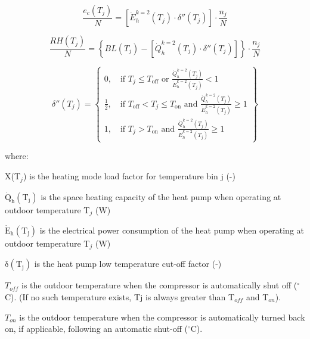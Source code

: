 \begin{equation}
  \frac{e_c(T_j)}{N} = \left[ \dot{E}_h^{k = 2}(T_j) \cdot \delta''(T_j) \right] \cdot \frac{n_j}{N}
\end{equation}

\begin{equation}
  \frac{RH(T_j)}{N} = \left\{ BL(T_j) - \left[\dot{Q}_h^{k = 2}(T_j) \cdot \delta''(T_j) \right] \right\} \cdot \frac{n_j}{N}
\end{equation}

\begin{equation}
\delta''(T_j) = \left\{
\begin{array}{l}
  0,\quad \text{if~}T_j \le T_{\text{off}} \text{~or~} \frac{\dot{Q}_h^{k = 2}(T_j)}{\dot{E}_h^{k=2}(T_j)} < 1 \\
  \frac{1}{2},\quad \text{if~} T_{\text{off}} < T_j \le T_{\text{on}} \text{~and~}\frac{\dot{Q}_h^{k=2}(T_j)}{\dot{E}_h^{k=2}(T_j)} \ge 1 \\
  1,\quad \text{if~}T_j > T_{\text{on}} \text{~and~} \frac{\dot{Q}_h^{k=2}(T_j)}{\dot{E}_h^{k=2}(T_j)} \ge 1
\end{array} \right\}
\end{equation}

where:

X(T\(_{j}\)) is the heating mode load factor for temperature bin j (-)

\({{\mathrm{\dot Q}}_{\mathrm{h}}}\left( {{{\mathrm{T}}_{\mathrm{j}}}} \right)\) is the space heating capacity of the heat pump when operating at outdoor temperature T\(_{j}\) (W)

\({{\mathrm{\dot E}}_{\mathrm{h}}}\left( {{{\mathrm{T}}_{\mathrm{j}}}} \right)\) is the electrical power consumption of the heat pump when operating at outdoor temperature T\(_{j}\) (W)

\({\mathrm{\delta }}\left( {{{\mathrm{T}}_{\mathrm{j}}}} \right)\) is the heat pump low temperature cut-off factor (-)

\(T_{off}\) is the outdoor temperature when the compressor is automatically shut off (\(^{\circ}\)C). (If no such temperature exists, Tj is always greater than T\(_{off}\) and T\(_{on}\)).

\(T_{on}\) is the outdoor temperature when the compressor is automatically turned back on, if applicable, following an automatic shut-off (\(^{\circ}\)C).

